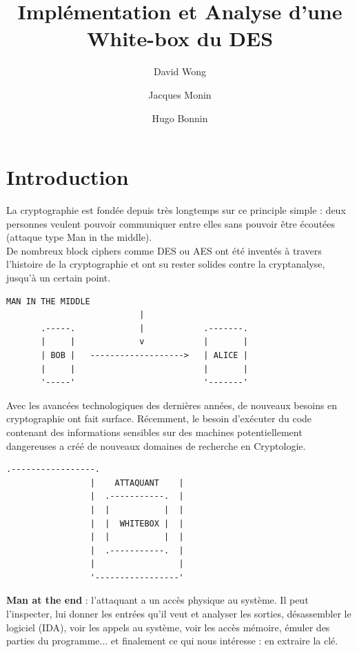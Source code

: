 \documentclass[a4paper,12pt]{article}
\author{David Wong
  \and Jacques Monin
  \and Hugo Bonnin}
\title{Implémentation et Analyse d'une White-box du DES}
\begin{document}
\maketitle

\newpage

\tableofcontents

\newpage

\section{Introduction}

La cryptographie est fondée depuis très longtemps sur ce principle simple : deux personnes veulent pouvoir communiquer entre elles sans pouvoir être écoutées (attaque type Man in the middle).\\
De nombreux block ciphers comme DES ou AES ont été inventés à travers l'histoire de la cryptographie et ont su rester solides contre la cryptanalyse, jusqu'à un certain point.\\

\begin{Verbatim}[samepage=true]
                   MAN IN THE MIDDLE
                           |
       .-----.             |            .-------.
       |     |             v            |       |
       | BOB |   ------------------->   | ALICE |
       |     |                          |       |
       '-----'                          '-------'
\end{Verbatim}

Avec les avancées technologiques des dernières années, de nouveaux besoins en cryptographie ont fait surface. Récemment, le besoin d'exécuter du code contenant des informations sensibles sur des machines potentiellement dangereuses a créé de nouveaux domaines de recherche en Cryptologie.\\

\begin{Verbatim}[samepage=true]
                 .-----------------. 
                 |    ATTAQUANT    |
                 |  .-----------.  |  
                 |  |           |  |  
                 |  |  WHITEBOX |  | 
                 |  |           |  | 
                 |  .-----------.  |
                 |                 |
                 '-----------------'
\end{Verbatim}

\textbf{Man at the end} : l'attaquant a un accès physique au système. Il peut l'inspecter, lui donner les entrées qu'il veut et analyser les sorties, désassembler le logiciel (IDA), voir les appels au système, voir les accès mémoire, émuler des parties du programme... et finalement ce qui nous intéresse : en extraire la clé.\\
\end{document}
